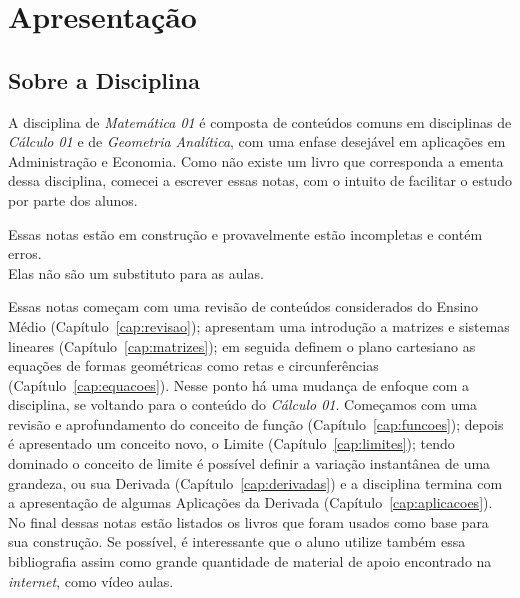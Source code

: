 \chapter{Apresentação}

\section{Sobre a Disciplina}

A disciplina de \emph{Matemática 01} é composta de conteúdos comuns em disciplinas de \emph{Cálculo 01} e 
de \emph{Geometria Analítica}, com uma enfase desejável em aplicações em Administração e Economia.
Como não existe um livro que corresponda a ementa dessa disciplina, comecei a escrever essas notas, 
com o intuito de facilitar o estudo por parte dos alunos. 

\begin{observacao}
    Essas notas estão em construção e provavelmente estão incompletas e contém erros. \\
    Elas não são um substituto para as aulas.
\end{observacao}

Essas notas começam com uma revisão de conteúdos considerados do Ensino Médio (Capítulo~\ref{cap:revisao});
apresentam uma introdução a matrizes e sistemas lineares (Capítulo~\ref{cap:matrizes});
em seguida definem o plano cartesiano as equações de formas geométricas como retas e circunferências (Capítulo~\ref{cap:equacoes}).
Nesse ponto há uma mudança de enfoque com a disciplina, se voltando para o conteúdo do \emph{Cálculo 01}.
Começamos com uma revisão e aprofundamento do conceito de função (Capítulo~\ref{cap:funcoes});
depois é apresentado um conceito novo, o Limite (Capítulo~\ref{cap:limites});
tendo dominado o conceito de limite é possível definir a variação instantânea de uma grandeza, ou sua Derivada (Capítulo~\ref{cap:derivadas}) e
a disciplina termina com a apresentação de algumas Aplicações da Derivada (Capítulo~\ref{cap:aplicacoes}).
No final dessas notas estão listados os livros que foram usados como base para sua construção. 
Se possível, é interessante que o aluno utilize também essa bibliografia assim como grande quantidade 
de material de apoio encontrado na \emph{internet}, como vídeo aulas.

